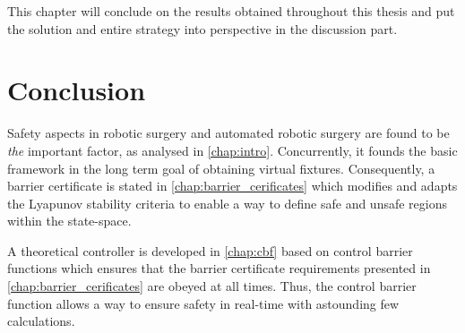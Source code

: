 This chapter will conclude on the results obtained throughout this thesis and put the solution and entire strategy into perspective in the discussion part.
\section*{Conclusion}
Safety aspects in robotic surgery and automated robotic surgery are found to be \textit{the} important factor, as analysed in \autoref{chap:intro}. Concurrently, it founds the basic framework in the long term goal of obtaining virtual fixtures. Consequently, a barrier certificate is stated in \autoref{chap:barrier_cerificates} which modifies and adapts the Lyapunov stability criteria to enable a way to define  safe and unsafe regions within the state-space. 

A theoretical controller is developed in \autoref{chap:cbf} based on control barrier functions which ensures that the  barrier certificate requirements presented in \autoref{chap:barrier_cerificates} are obeyed at all times. Thus, the control barrier function allows a way to ensure safety in real-time with astounding few calculations.

